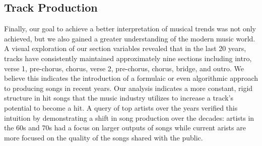 \documentclass[
  12pt,
]{article}
\begin{document}
\hypertarget{track-production}{%
\subsection{Track Production}\label{track-production}}

Finally, our goal to achieve a better interpretation of musical trends
was not only achieved, but we also gained a greater understanding of the
modern music world. A visual exploration of our section variables
revealed that in the last 20 years, tracks have consistently maintained
approximately nine sections including intro, verse 1, pre-chorus,
chorus, verse 2, pre-chorus, chorus, bridge, and outro. We believe this
indicates the introduction of a formulaic or even algorithmic approach
to producing songs in recent years. Our analysis indicates a more
constant, rigid structure in hit songs that the music industry utilizes
to increase a track's potential to become a hit. A query of top artists
over the years verified this intuition by demonstrating a shift in song
production over the decades: artists in the 60s and 70s had a focus on
larger outputs of songs while current arists are more focused on the
quality of the songs shared with the public.
\end{document}
